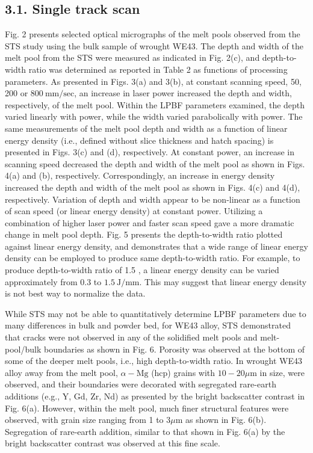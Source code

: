 \documentclass[10pt]{article}
\begin{document}
\subsection*{3.1. Single track scan}
Fig. 2 presents selected optical micrographs of the melt pools observed from the STS study using the bulk sample of wrought WE43. The depth and width of the melt pool from the STS were measured as indicated in Fig. 2(c), and depth-to-width ratio was determined as reported in Table 2 as functions of processing parameters. As presented in Figs. 3(a) and 3(b), at constant scanning speed, 50, 200 or $800 \mathrm{~mm} / \mathrm{sec}$, an increase in laser power increased the depth and width, respectively, of the melt pool. Within the LPBF parameters examined, the depth varied linearly with power, while the width varied parabolically with power. The same measurements of the melt pool depth and width as a function of linear energy density (i.e., defined without slice thickness and hatch spacing) is presented in Figs. 3(c) and (d), respectively. At constant power, an increase in scanning speed decreased the depth and width of the melt pool as shown in Figs. 4(a) and (b), respectively. Correspondingly, an increase in energy density increased the depth and width of the melt pool as shown in Figs. 4(c) and 4(d), respectively. Variation of depth and width appear to be non-linear as a function of scan speed (or linear energy density) at constant power. Utilizing a combination of higher laser power and faster scan speed gave a more dramatic change in melt pool depth. Fig. 5 presents the depth-to-width ratio plotted against linear energy density, and demonstrates that a wide range of linear energy density can be employed to produce same depth-to-width ratio. For example, to produce depth-to-width ratio of 1.5 , a linear energy density can be varied approximately from 0.3 to $1.5 \mathrm{~J} / \mathrm{mm}$. This may suggest that linear energy density is not best way to normalize the data.

While STS may not be able to quantitatively determine LPBF parameters due to many differences in bulk and powder bed, for WE43 alloy, STS demonstrated that cracks were not observed in any of the solidified melt pools and melt-pool/bulk boundaries as shown in Fig. 6. Porosity was observed at the bottom of some of the deeper melt pools, i.e., high depth-to-width ratio. In wrought WE43 alloy away from the melt pool, $\alpha-\mathrm{Mg}$ (hcp) grains with $10-20 \mu \mathrm{m}$ in size, were observed, and their boundaries were decorated with segregated rare-earth additions (e.g., Y, Gd, Zr, Nd) as presented by the bright backscatter contrast in Fig. 6(a). However, within the melt pool, much finer structural features were observed, with grain size ranging from 1 to $3 \mu \mathrm{m}$ as shown in Fig. 6(b). Segregation of rare-earth addition, similar to that shown in Fig. 6(a) by the bright backscatter contrast was observed at this fine scale.
\end{document}
